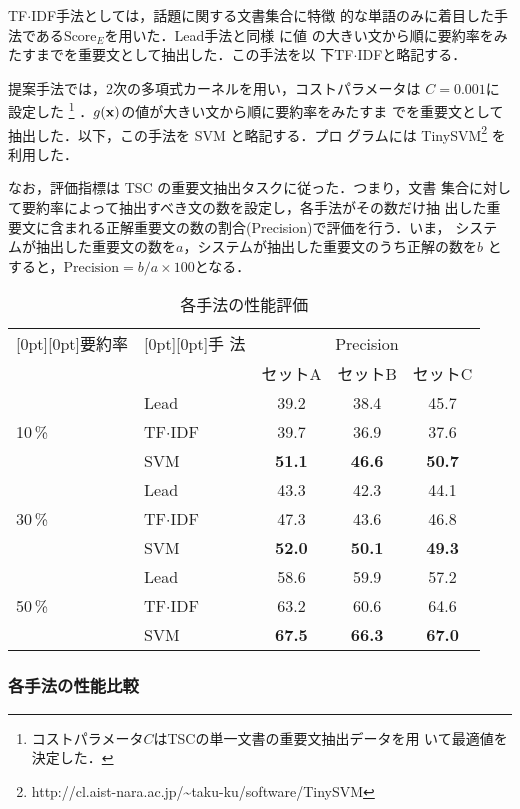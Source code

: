 TF$\cdot$IDF手法としては，話題に関する文書集合に特徴
的な単語のみに着目した手法である$\mbox{Score}_E$を用いた．Lead手法と同様
に値
の大きい文から順に要約率をみたすまでを重要文として抽出した．この手法を以
下TF$\cdot$IDFと略記する．

提案手法では，2次の多項式カーネルを用い，コストパラメータは
$C=0.001$に設定した
\footnote{
コストパラメータ$C$はTSCの単一文書の重要文抽出データを用
いて最適値を決定した．
}
．$g({\bf x})$の値が大きい文から順に要約率をみたすま
でを重要文として抽出した．以下，この手法を SVM と略記する．プロ
グラムには
TinySVM\footnote{http://cl.aist-nara.ac.jp/\~{}taku-ku/software/TinySVM}
を利用した．

なお，評価指標は TSC の重要文抽出タスクに従った．つまり，文書
集合に対して要約率によって抽出すべき文の数を設定し，各手法がその数だけ抽
出した重要文に含まれる正解重要文の数の割合(Precision)で評価を行う．いま，
システ
ムが抽出した重要文の数を$a$，システムが抽出した重要文のうち正解の数を$b$
とすると，$\mbox{Precision}= b/a \times 100 $となる．

\begin{table*}[tb]
\small
 \begin{center}
  \caption{各手法の性能評価}
  \label{tab04}
  \begin{tabular}{l|l|ccc}
   \hline\hline
   \raisebox{-1.8ex}[0pt][0pt]{要約率} & \raisebox{-1.8ex}[0pt][0pt]{手
   法} & \multicolumn{3}{|c}{Precision} \\   
   \cline{3-5}
   & & セットA& セットB & セットC\\
   \hline
    & Lead &  39.2 & 38.4 & 45.7\\
   10\,\%&TF$\cdot$IDF & 39.7 & 36.9 &37.6\\
    & SVM & {\bf 51.1} & {\bf 46.6} &{\bf 50.7}\\
   \hline
    & Lead & 43.3 &  42.3&  44.1\\
   30\,\% & TF$\cdot$IDF &47.3 & 43.6 & 46.8 \\
    & SVM & {\bf 52.0} & {\bf 50.1} & {\bf 49.3}\\
   \hline
    & Lead & 58.6 & 59.9 & 57.2\\
   50\,\% & TF$\cdot$IDF & 63.2 &  60.6& 64.6\\
    & SVM & {\bf 67.5} & {\bf 66.3} & {\bf 67.0}\\
   \hline
  \end{tabular}
 \end{center}
\end{table*}

\subsubsection{各手法の性能比較}

